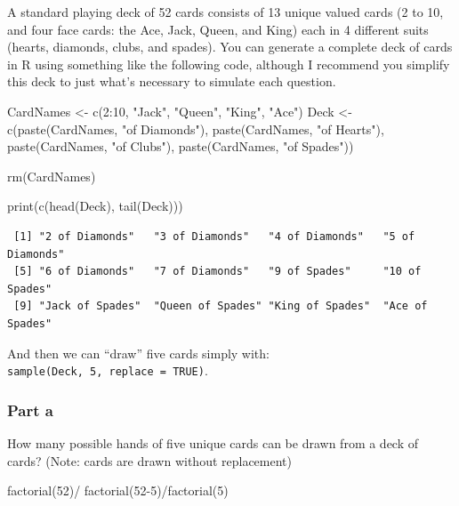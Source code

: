 \documentclass[
  letterpaper,
  DIV=11,
  numbers=noendperiod]{scrartcl}
\newenvironment{Shaded}{\begin{snugshade}}{\end{snugshade}}
\newcommand{\DecValTok}[1]{\textcolor[rgb]{0.68,0.00,0.00}{#1}}
\newcommand{\FunctionTok}[1]{\textcolor[rgb]{0.28,0.35,0.67}{#1}}
\newcommand{\NormalTok}[1]{\textcolor[rgb]{0.00,0.23,0.31}{#1}}
\newcommand{\OtherTok}[1]{\textcolor[rgb]{0.00,0.23,0.31}{#1}}
\newcommand{\SpecialCharTok}[1]{\textcolor[rgb]{0.37,0.37,0.37}{#1}}
\newcommand{\StringTok}[1]{\textcolor[rgb]{0.13,0.47,0.30}{#1}}
\begin{document}
A standard playing deck of 52 cards consists of 13 unique valued cards
(2 to 10, and four face cards: the Ace, Jack, Queen, and King) each in 4
different suits (hearts, diamonds, clubs, and spades). You can generate
a complete deck of cards in R using something like the following code,
although I recommend you simplify this deck to just what's necessary to
simulate each question.

\begin{Shaded}
\begin{Highlighting}[]
\NormalTok{CardNames }\OtherTok{\textless{}{-}} \FunctionTok{c}\NormalTok{(}\DecValTok{2}\SpecialCharTok{:}\DecValTok{10}\NormalTok{, }\StringTok{"Jack"}\NormalTok{, }\StringTok{"Queen"}\NormalTok{, }\StringTok{"King"}\NormalTok{, }\StringTok{"Ace"}\NormalTok{)}
\NormalTok{Deck }\OtherTok{\textless{}{-}} \FunctionTok{c}\NormalTok{(}\FunctionTok{paste}\NormalTok{(CardNames, }\StringTok{"of Diamonds"}\NormalTok{),}
          \FunctionTok{paste}\NormalTok{(CardNames, }\StringTok{"of Hearts"}\NormalTok{),}
          \FunctionTok{paste}\NormalTok{(CardNames, }\StringTok{"of Clubs"}\NormalTok{),}
          \FunctionTok{paste}\NormalTok{(CardNames, }\StringTok{"of Spades"}\NormalTok{))}

\FunctionTok{rm}\NormalTok{(CardNames)}

\FunctionTok{print}\NormalTok{(}\FunctionTok{c}\NormalTok{(}\FunctionTok{head}\NormalTok{(Deck), }\FunctionTok{tail}\NormalTok{(Deck)))}
\end{Highlighting}
\end{Shaded}

\begin{verbatim}
 [1] "2 of Diamonds"   "3 of Diamonds"   "4 of Diamonds"   "5 of Diamonds"  
 [5] "6 of Diamonds"   "7 of Diamonds"   "9 of Spades"     "10 of Spades"   
 [9] "Jack of Spades"  "Queen of Spades" "King of Spades"  "Ace of Spades"  
\end{verbatim}

And then we can ``draw'' five cards simply with:
\texttt{sample(Deck,\ 5,\ replace\ =\ TRUE)}.

\hypertarget{part-a-5}{%
\subsubsection{Part a}\label{part-a-5}}

How many possible hands of five unique cards can be drawn from a deck of
cards? (Note: cards are drawn without replacement)

\begin{Shaded}
\begin{Highlighting}[]
\FunctionTok{factorial}\NormalTok{(}\DecValTok{52}\NormalTok{)}\SpecialCharTok{/} \FunctionTok{factorial}\NormalTok{(}\DecValTok{52{-}5}\NormalTok{)}\SpecialCharTok{/}\FunctionTok{factorial}\NormalTok{(}\DecValTok{5}\NormalTok{)}
\end{Highlighting}
\end{Shaded}
\end{document}
